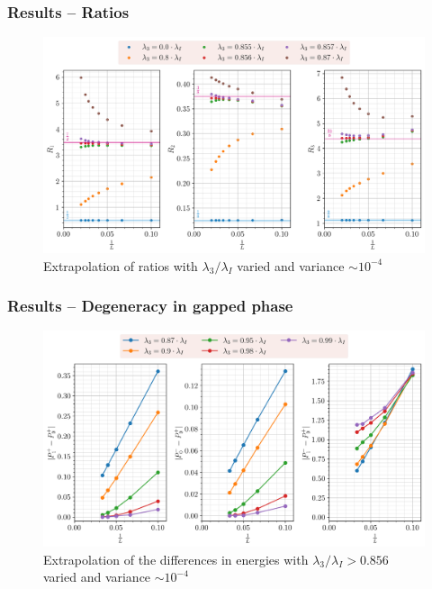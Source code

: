 \documentclass[10pt]{beamer}
\begin{document}
\begin{frame}
    \frametitle{Results -- Ratios}

    \begin{figure}
        \includegraphics[scale=0.43]{../../graphs/ratios/J=1.0_h=1.0_i=1.0_c=0.0.png}
        \caption{Extrapolation of ratios with $\lambda_3/\lambda_I$ varied and variance $\sim 10^{-4}$}
    \end{figure}
\end{frame}

\begin{frame}
    \frametitle{Results -- Degeneracy in gapped phase}

    \begin{figure}
        \includegraphics[scale=0.43]{../../graphs/degeneracy/J=1.0_h=1.0_i=1.0_c=0.0.png}
        \caption{Extrapolation of the differences in energies with $\lambda_3/\lambda_I >0.856$ varied and variance $\sim 10^{-4}$}
    \end{figure}
\end{frame}
\end{document}
